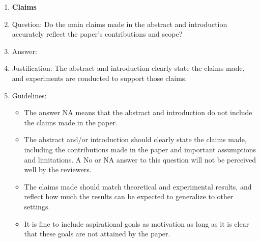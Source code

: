 \documentclass{article}
\begin{document}
\begin{enumerate}

\item {\bf Claims}
    \item[] Question: Do the main claims made in the abstract and introduction accurately reflect the paper's contributions and scope?
    \item[] Answer: \answerYes{} %
    \item[] Justification: The abstract and introduction clearly state the claims made, and experiments are conducted to support those claims.
    \item[] Guidelines:
    \begin{itemize}
        \item The answer NA means that the abstract and introduction do not include the claims made in the paper.
        \item The abstract and/or introduction should clearly state the claims made, including the contributions made in the paper and important assumptions and limitations. A No or NA answer to this question will not be perceived well by the reviewers. 
        \item The claims made should match theoretical and experimental results, and reflect how much the results can be expected to generalize to other settings. 
        \item It is fine to include aspirational goals as motivation as long as it is clear that these goals are not attained by the paper. 
    \end{itemize}


\end{enumerate}
\end{document}
